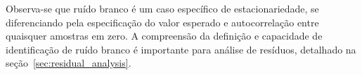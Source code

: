 Observa-se que ruído branco é um caso específico de estacionariedade, se
diferenciando pela especificação do valor esperado e autocorrelação entre
quaisquer amostras em zero. A compreensão da definição e capacidade de
identificação de ruído branco é importante para análise de resíduos, detalhado
na seção~\ref{sec:residual_analysis}.
